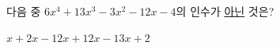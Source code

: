 다음 중 $6x^4+13x^3-3x^2-12x-4$의 인수가 \underline{아닌} 것은?
\begin{choices32}{$x+2$}{$x-1$}{$2x+1$}{$2x-1$}{$3x+2$}\end{choices32}
